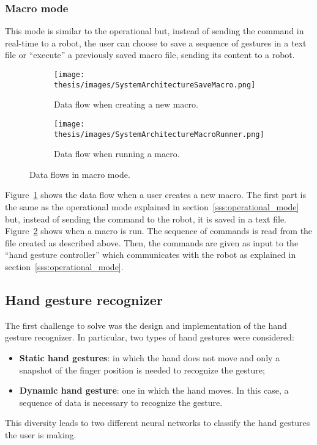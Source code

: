 \documentclass[../thesis.tex]{subfiles}
\begin{document}
\subsubsection{Macro mode}
This mode is similar to the operational but, instead of sending the command in real-time to a robot, the user can choose to save a sequence of gestures in a text file or ``execute'' a previously saved macro file, sending its content to a robot. 
\begin{figure}[H]
    \centering

    \begin{subfigure}{\textwidth}
        \texttt{[image: thesis/images/SystemArchitectureSaveMacro.png]}
        \caption{Data flow when creating a new macro.}
        \label{fig:system_architecture_save_macro}
    \end{subfigure}
    \hfill
    \begin{subfigure}{\textwidth}
        \texttt{[image: thesis/images/SystemArchitectureMacroRunner.png]}
        \caption{Data flow when running a macro.}
        \label{fig:system_architecture_run_macro}
    \end{subfigure}
    
    \caption{Data flows in macro mode.}
    \label{fig:macro_data_flows}
\end{figure}
Figure~\ref{fig:system_architecture_save_macro} shows the data flow when a user creates a new macro. The first part is the same as the operational mode explained in section~\ref{sss:operational_mode} but, instead of sending the command to the robot, it is saved in a text file. Figure~\ref{fig:system_architecture_run_macro} shows when a macro is run. The sequence of commands is read from the file created as described above. Then, the commands are given as input to the ``hand gesture controller'' which communicates with the robot as explained in section~\ref{sss:operational_mode}.

\subsection{Hand gesture recognizer}
The first challenge to solve was the design and implementation of the hand gesture recognizer. In particular, two types of hand gestures were considered: 
\begin{itemize}
    \item \textbf{Static hand gestures}: in which the hand does not move and only a snapshot of the finger position is needed to recognize the gesture;
    \item \textbf{Dynamic hand gesture}: one in which the hand moves. In this case, a sequence of data is necessary to recognize the gesture. 
\end{itemize}
This diversity leads to two different neural networks to classify the hand gestures the user is making. 
\end{document}
